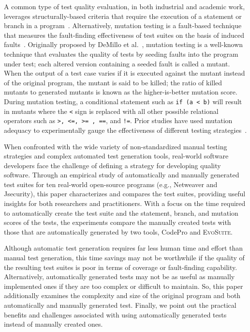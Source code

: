 
A common type of test quality evaluation, in both industrial and academic work, leverages structurally-based criteria that require the execution of a statement or branch in a program~\cite{weyuker1988evaluation}.  Alternatively, mutation testing is a fault-based technique that measures the fault-finding effectiveness of test suites on the basis of induced faults~\cite{demillo1978hints, hamlet1977testing}.  Originally proposed by DeMillo et al.~\cite{demillo1978hints}, mutation testing is a well-known technique that evaluates the quality of tests by seeding faults into the program under test; each altered version containing a seeded fault is called a mutant. When the output of a test case varies if it is executed against the mutant instead of the original program, the mutant is said to be killed; the ratio of killed mutants to generated mutants is known as the higher-is-better mutation score. During mutation testing, a conditional statement such as \texttt{if (a < b)} will result in mutants where the \texttt{<} sign is replaced with all other possible relational operators such as \texttt{>, <=, >= , ==}, and \texttt{!=}. Prior studies have used mutation adequacy to experimentally gauge the effectiveness of different testing strategies~\cite{andrews2005mutation,andrews2006,do2006,just2014}.  


When confronted with the wide variety of non-standardized manual testing strategies and complex automated test generation tools, real-world software developers face the challenge of defining a strategy for developing quality software.  Through an empirical study of automatically and manually generated test suites for ten real-world open-source programs (e.g., Netweaver and Jsecurity), this paper characterizes and compares the test suites, providing useful insights for both researchers and practitioners. With a focus on the time required to automatically create the test suite and the statement, branch, and mutation scores of the tests, the experiments compare the manually created tests with those that are automatically generated by two tools, CodePro and \textsc{EvoSuite}.  


Although automatic test generation requires far less human time and effort than manual test generation, this time savings may not be worthwhile if the quality of the resulting test suites is poor in terms of coverage or fault-finding capability.  Alternatively, automatically generated tests may not be as useful as manually implemented ones if they are too complex or difficult to maintain.  So, this paper additionally examines the complexity and size of the original program and both automatically and manually generated test.  Finally, we point out the practical benefits and challenges associated with using automatically generated tests instead of manually created ones.

